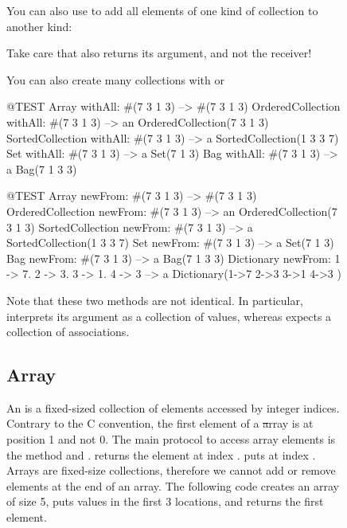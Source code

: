 \documentclass[a4paper,10pt,twoside]{book}
\begin{document}
\begin{figure}
\begin{center}
You can also use  to add all elements of one kind of collection to another kind:

\noindent
Take care that  also returns its argument, and not the receiver!

You can also create many collections with  or 

\begin{code}{@TEST}
Array withAll: #(7 3 1 3)                      --> #(7 3 1 3)
OrderedCollection withAll: #(7 3 1 3) --> an OrderedCollection(7 3 1 3)
SortedCollection withAll: #(7 3 1 3)    --> a SortedCollection(1 3 3 7)
Set withAll: #(7 3 1 3)                         --> a Set(7 1 3)
Bag withAll: #(7 3 1 3)                        --> a Bag(7 1 3 3)
\end{code}

\begin{code}{@TEST}
Array newFrom: #(7 3 1 3)                                          --> #(7 3 1 3)
OrderedCollection newFrom: #(7 3 1 3)                     --> an OrderedCollection(7 3 1 3)
SortedCollection newFrom: #(7 3 1 3)                       --> a SortedCollection(1 3 3 7)
Set newFrom: #(7 3 1 3)                                            --> a Set(7 1 3)
Bag newFrom: #(7 3 1 3)                                           --> a Bag(7 1 3 3)
Dictionary newFrom: {1 -> 7. 2 -> 3. 3 -> 1. 4 -> 3} --> a Dictionary(1->7 2->3 3->1 4->3 )
\end{code}
\noindent
Note that these two methods are not identical.
In particular,  interprets its argument as a collection of values, whereas  expects a collection of associations.

\subsection{Array}
An  is a fixed-sized collection of elements accessed by integer indices.
Contrary to the C convention, the first element of a \st array is at position 1 and not 0. 
The main protocol to access array elements is the method  and .
 returns the element at index .
 puts  at index .
Arrays are fixed-size collections, therefore we cannot add or remove elements at the end of an array.
The following code creates an array of size 5, puts values in the first 3 locations, and returns the first element. 


\end{center}
\end{figure}
\end{document}
